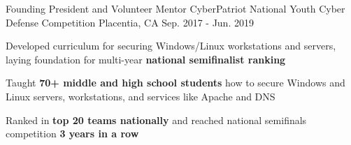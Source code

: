 \begin{cventries}
  \cventry
    {Founding President and Volunteer Mentor} %
    {CyberPatriot National Youth Cyber Defense Competition} %
    {Placentia, CA} %
    {Sep. 2017 - Jun. 2019} %
    {
      \begin{cvitems} %
        \item {Developed curriculum for securing Windows/Linux workstations and servers, laying foundation for multi-year \textbf{national semifinalist ranking}}
        \item {Taught \textbf{70+ middle and high school students} how to secure Windows and Linux servers, workstations, and services like Apache and DNS}
        \item {Ranked in \textbf{top 20 teams nationally} and reached national semifinals competition \textbf{3 years in a row}}
      \end{cvitems}
    }

\end{cventries}
